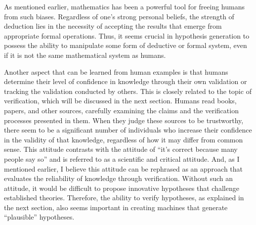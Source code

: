 \documentclass{book}
\begin{document}
As mentioned earlier, mathematics has been a powerful tool for freeing humans from such biases. Regardless of one's strong personal beliefs, the strength of deduction lies in the necessity of accepting the results that emerge from appropriate formal operations. Thus, it seems crucial in hypothesis generation to possess the ability to manipulate some form of deductive or formal system, even if it is not the same mathematical system as humans.

Another aspect that can be learned from human examples is that humans determine their level of confidence in knowledge through their own validation or tracking the validation conducted by others. This is closely related to the topic of verification, which will be discussed in the next section. Humans read books, papers, and other sources, carefully examining the claims and the verification processes presented in them. When they judge these sources to be trustworthy, there seem to be a significant number of individuals who increase their confidence in the validity of that knowledge, regardless of how it may differ from common sense. This attitude contrasts with the attitude of ``it's correct because many people say so'' and is referred to as a scientific and critical attitude. And, as I mentioned earlier, I believe this attitude can be rephrased as an approach that evaluates the reliability of knowledge through verification. Without such an attitude, it would be difficult to propose innovative hypotheses that challenge established theories. Therefore, the ability to verify hypotheses, as explained in the next section, also seems important in creating machines that generate ``plausible'' hypotheses.


\end{document}
